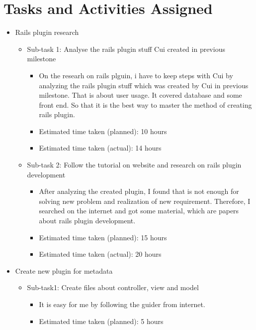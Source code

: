 \section*{Tasks and Activities Assigned}
\begin{itemize}
    \item Rails plugin research
        \begin{itemize}
            \item Sub-task 1: Analyse the rails plugin stuff Cui created in previous milestone
                \begin{itemize}
                    \item On the researh on rails plguin, i have to keep steps with Cui by analyzing the rails plugin stuff which was created by Cui in previous milestone. That is about user usage. It covered database and some front end. So that it is the best way to master the method of creating rails plugin.
                    \item Estimated time taken (planned): 10 hours
                    \item Estimated time taken (actual): 14 hours
                \end{itemize}
            \item Sub-task 2: Follow the tutorial on website and research on rails plugin development
                \begin{itemize}
                    \item After analyzing the created plugin, I found that is not enough for solving new problem and realization of new requirement. Therefore, I searched on the internet and got some material, which are papers about rails plugin development.
                    \item Estimated time taken (planned): 15 hours
                    \item Estimated time taken (actual): 20 hours
                \end{itemize}
        \end{itemize}
    \item Create new plugin for metadata
        \begin{itemize}
            \item Sub-task1: Create files about controller, view and model
                \begin{itemize}
                    \item It is easy for me by following the guider from internet. 
                    \item Estimated time taken (planned): 5 hours

\end{itemize}
\end{itemize}
\end{itemize}
